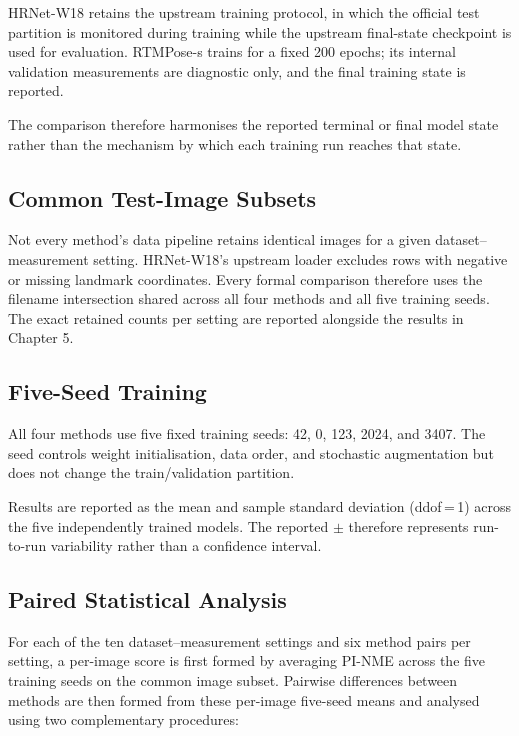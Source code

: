 HRNet-W18 retains the upstream training protocol, in which the
official test partition is monitored during training while the
upstream final-state checkpoint is used for evaluation. RTMPose-s
trains for a fixed 200 epochs; its internal validation measurements
are diagnostic only, and the final training state is reported.

The comparison therefore harmonises the reported terminal or final
model state rather than the mechanism by which each training run
reaches that state.


\subsection{Common Test-Image Subsets}
\label{sec:results-common-subset}

Not every method's data pipeline retains identical images for a given
dataset--measurement setting. HRNet-W18's upstream loader excludes
rows with negative or missing landmark coordinates. Every formal
comparison therefore uses the filename intersection shared across all
four methods and all five training seeds. The exact retained counts
per setting are reported alongside the results in Chapter 5.


\subsection{Five-Seed Training}
\label{sec:setup-multiseed}

All four methods use five fixed training seeds: 42, 0, 123, 2024,
and 3407. The seed controls weight initialisation, data order, and
stochastic augmentation but does not change the train/validation
partition.

Results are reported as the mean and sample standard deviation
(ddof\,=\,1) across the five independently trained models. The
reported $\pm$ therefore represents run-to-run variability rather
than a confidence interval.


\subsection{Paired Statistical Analysis}

For each of the ten dataset--measurement settings and six method pairs
per setting, a per-image score is first formed by averaging PI-NME
across the five training seeds on the common image subset. Pairwise
differences between methods are then formed from these per-image
five-seed means and analysed using two complementary procedures:

